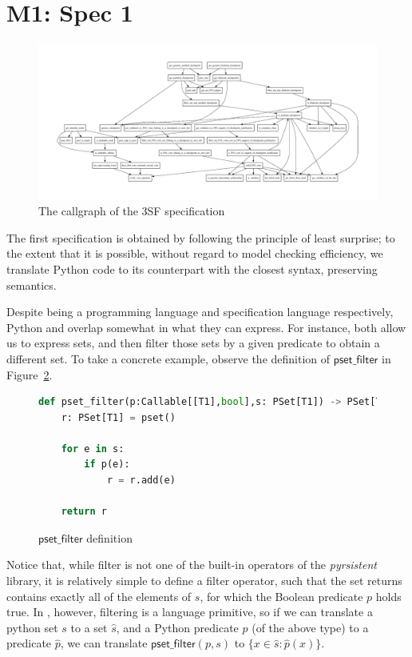 
\section{M1: Spec 1}

\begin{figure}
    \centering
    \includegraphics[width=\textwidth,angle=-90]{ffg-callgraph.pdf}
    \caption{The callgraph of the 3SF specification}
    \label{fig:your_label}
\end{figure}

The first specification is obtained by following the principle of least surprise; to the extent that it is possible, without regard to model checking efficiency, we translate Python code to its \tlap{} counterpart with the closest syntax, preserving semantics.

Despite being a programming language and specification language respectively, Python and \tlap{} overlap somewhat in what they can express. 
For instance, both allow us to express sets, and then filter those sets by a given predicate to obtain a different set.
To take a concrete example, observe the definition of $\mathsf{pset\_filter}$ in Figure~\ref{py_filter}.
\begin{figure}
\begin{lstlisting}[language=Python]
def pset_filter(p:Callable[[T1],bool],s: PSet[T1]) -> PSet[T1]:
    r: PSet[T1] = pset()

    for e in s:
        if p(e):
            r = r.add(e)

    return r
\end{lstlisting}
\caption{$\mathsf{pset\_filter}$ definition \label{py_filter}}
\end{figure}
%
Notice that, while filter is not one of the built-in operators of the \emph{pyrsistent} library, it is relatively simple to define a filter operator, such that the set returns contains exactly all of the elements of $s$, for which the Boolean predicate $p$ holds true.
In \tlap{}, however, filtering is a language primitive, so if we can translate a python set $s$ to a \tlap{} set $\hat{s}$, and a Python predicate $p$ (of the above type) to a \tlap{} predicate $\hat{p}$, we can translate $\mathsf{pset\_filter}(p, s)$ to $\{ x \in \hat{s}\colon \hat{p}(x) \}$.

